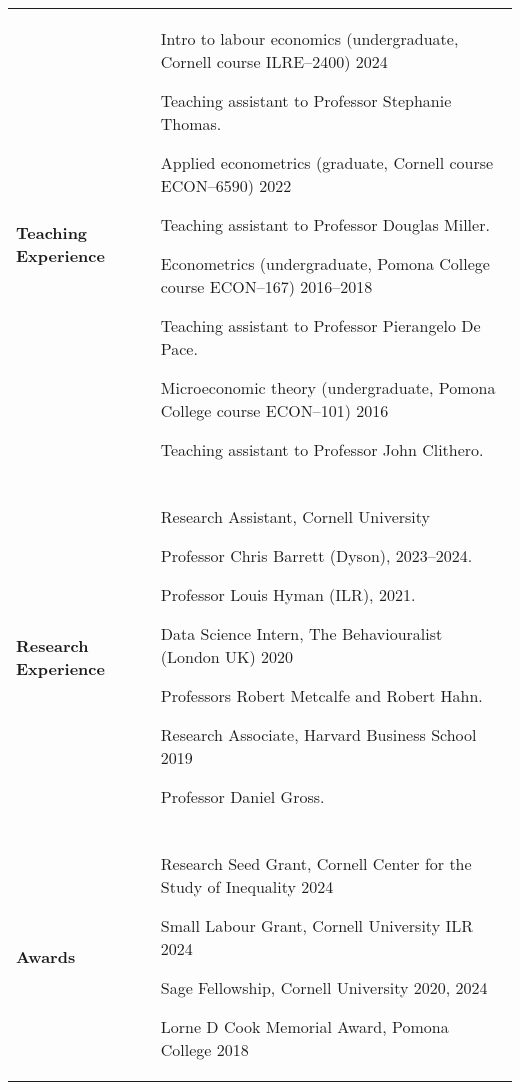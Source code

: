 \documentclass[letterpaper,11pt,oneside]{article}
\begin{document}
\begin{longtable}[\textwidth]{p{} p{}}
\textbf{Teaching Experience}
    & Intro to labour economics (undergraduate, Cornell course ILRE--2400) \hfill 2024

    \indent\hspace{1cm} Teaching assistant to Professor Stephanie Thomas.

    Applied econometrics (graduate, Cornell course ECON--6590) \hfill 2022 
    
    \indent\hspace{1cm} Teaching assistant to Professor Douglas Miller.
    
    Econometrics (undergraduate, Pomona College course ECON--167) \hfill 2016--2018
    
    \indent\hspace{1cm} Teaching assistant to Professor Pierangelo De Pace.

    Microeconomic theory (undergraduate, Pomona College course ECON--101) \hfill 2016

    \indent\hspace{1cm} Teaching assistant to Professor John Clithero. \\ \\

\textbf{Research Experience}
    & Research Assistant, Cornell University

    \indent\hspace{1cm} Professor Chris Barrett (Dyson), 2023--2024.

    \indent\hspace{1cm} Professor Louis Hyman (ILR), 2021.

    Data Science Intern, The Behaviouralist (London UK) \hfill 2020

    \indent\hspace{1cm} Professors Robert Metcalfe and Robert Hahn.

    Research Associate, Harvard Business School \hfill 2019

    \indent\hspace{1cm} Professor Daniel Gross. \\ \\

\textbf{Awards}
    & Research Seed Grant, Cornell Center for the Study of Inequality \hfill 2024
    
    Small Labour Grant, Cornell University ILR \hfill 2024
    
    Sage Fellowship, Cornell University \hfill 2020, 2024
    
    Lorne D Cook Memorial Award, Pomona College \hfill 2018
    

\end{longtable}
\end{document}
